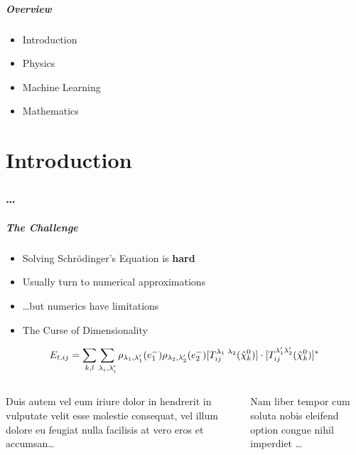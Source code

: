 \begin{frame}
\frametitle{Overview}
  \begin{itemize}[<+->]
      \item {Introduction}
      \item {Physics}
      \item {Machine Learning}
      \item {Mathematics}
  \end{itemize}
\end{frame}

\part[Part slide]{Introduction}
\makepart%

\section{\ldots}

\begin{frame}[t,label=intro]
\frametitle{The Challenge}
\begin{itemize}[<+->]
    \item Solving Schrödinger's Equation is \textbf{hard}
    \item Usually turn to numerical approximations
    \item \ldots but numerics have limitations
    \item The Curse of Dimensionality
\end{itemize}

\[
    E_{t,ij} = \sum_{k,l} \sum_{\lambda_i, \lambda_i'}
        \rho_{\lambda_1,\lambda_1'}(e^-_1)
        \rho_{\lambda_2,\lambda_2'}(e^-_2)
        [T_{ij}^{\lambda_1\phantom{'} \lambda_2}(\tilde{\chi}^0_k)]
        \cdot
        [T_{ij}^{\lambda_1' \lambda_2'}(\tilde{\chi}^0_k)]^*
\]

\begin{columns}
    \begin{column}[t]{0.48\textwidth}
    Duis autem vel eum iriure dolor in hendrerit in vulputate velit
    esse molestie consequat, vel illum dolore eu feugiat nulla
    facilisis at vero eros et accumsan\ldots
    \end{column}
    \begin{column}[t]{0.48\textwidth}
    Nam liber tempor cum soluta nobis eleifend option congue nihil
    imperdiet \ldots
    \end{column}
\end{columns}
\end{frame}


